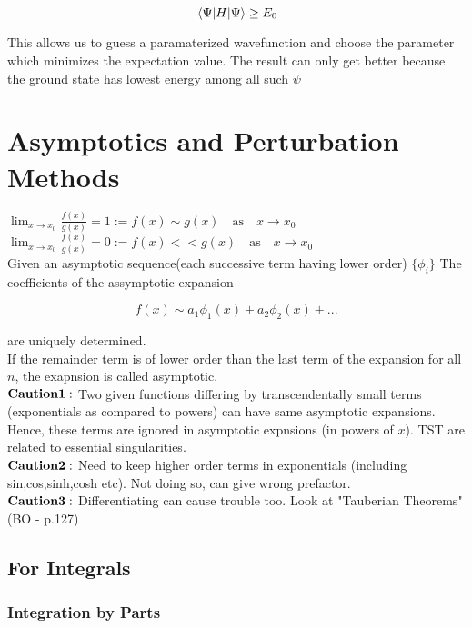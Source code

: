 \documentclass{report}
\begin{document}
$$\expval{H}{\Psi} \ge E_0$$

\noindent This allows us to guess a paramaterized wavefunction and choose the parameter which minimizes the expectation value. The result can only get better because the ground state has lowest energy among all such $\psi$

\chapter{Asymptotics and Perturbation Methods}

$\lim_{x\to x_0} \frac{f(x)}{g(x)} = 1 := f(x) \sim g(x) \quad\mathrm{as}\quad  x\to x_0$\\

\noindent$\lim_{x\to x_0} \frac{f(x)}{g(x)} = 0 := f(x) << g(x)\quad\mathrm{as}\quad  x\to x_0$\\


\noindent Given an asymptotic sequence(each successive term having lower order) $\{\phi_i\}$ The coefficients of the assymptotic expansion 

$$ f(x) \sim a_1\phi_1(x) + a_2\phi_2(x) + ... $$

\noindent are uniquely determined.\\

\noindent If the remainder term is of lower order than the last term of the expansion for all $n$, the exapnsion is called asymptotic.\\

\noindent $\bold{Caution 1:}$ Two given functions differing by transcendentally small terms (exponentials as compared to powers) can have same asymptotic expansions. Hence, these terms are ignored in asymptotic expnsions (in powers of $x$). TST are related to essential singularities.\\

\noindent $\bold {Caution 2:}$ Need to keep higher order terms in exponentials (including sin,cos,sinh,cosh etc). Not doing so, can give wrong prefactor.\\

\noindent $\bold{Caution 3:}$ Differentiating can cause trouble too. Look at "Tauberian Theorems" (BO - p.127)

\section{For Integrals}

\subsection{Integration by Parts}
\end{document}
